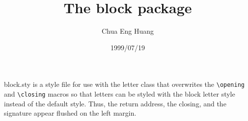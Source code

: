 \documentclass[DIV=7, pagesize=auto, version=last]{scrartcl}
\title{The \textsf{block} package}
\author{Chua Eng Huang}
\date{1999/07/19}
\begin{document}
\maketitle

\noindent
\textsf{block.sty} is a style file for use with the \textsf{letter} class that overwrites the \verb+\opening+ and \verb+\closing+ macros so that letters can be styled with the block letter style instead of the default style. Thus, the return address, the closing, and the signature appear flushed on the left margin.
\end{document}
